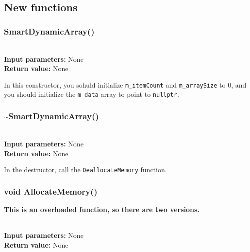 \documentclass[a4paper,12pt]{book}
\begin{document}
        
    \subsection*{New functions}



    \subsubsection*{SmartDynamicArray()}

    \begin{framed} ~\\
        \textbf{Input parameters:} None \\
        \textbf{Return value:} None
    \end{framed}

    In this constructor, you sohuld initialize \texttt{m\_itemCount} and
    \texttt{m\_arraySize} to 0, and you should initialize the \texttt{m\_data}
    array to point to \texttt{nullptr}.

    
    \hrulefill
    \subsubsection*{\textasciitilde SmartDynamicArray()}

    \begin{framed} ~\\
        \textbf{Input parameters:} None \\
        \textbf{Return value:} None
    \end{framed}

    In the destructor, call the \texttt{DeallocateMemory} function.

    
    \hrulefill
    \subsubsection*{void AllocateMemory()}

    \textbf{This is an overloaded function, so there are two versions.}

    \begin{framed} ~\\
        \textbf{Input parameters:} None \\
        \textbf{Return value:} None
    \end{framed}
\end{document}
